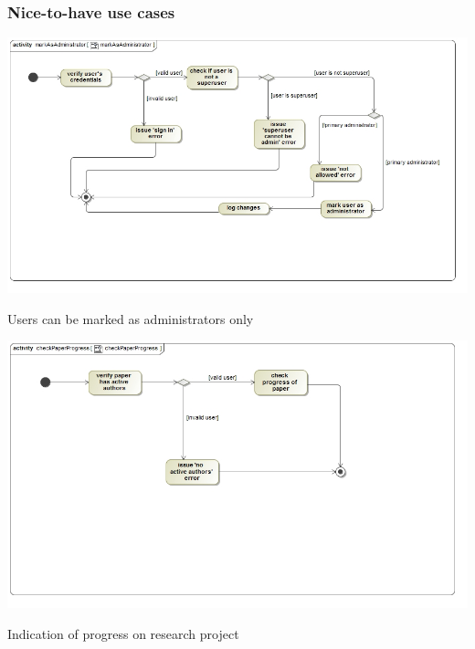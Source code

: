 \documentclass[a4paper,12pt]{report}
\begin{document}
\subsubsection{Nice-to-have use cases}

\begin{flushleft}
	\includegraphics[scale=0.5]{./images/act__markAsAdministrator__markAsAdministrator.jpg} 
	\begin{center}
		Users can be marked as administrators only
	\end{center}

	\includegraphics[scale=0.5]{./images/act__checkPaperProgress__checkPaperProgress.jpg} 
	\begin{center}
		Indication of progress on research project
	\end{center}
\end{flushleft}

\newpage
\end{document}
